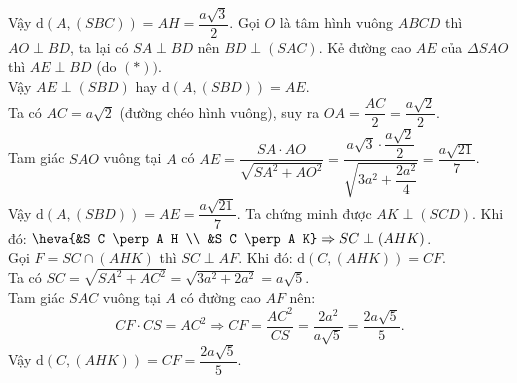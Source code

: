 \begin{ex}
{\begin{itemchoice}
    Vậy $\mathrm{d}(A,(S B C))=A H=\dfrac{a \sqrt{3}}{2}$.
   \itemch  Gọi $O$ là tâm hình vuông $A B C D$ thì $A O \perp B D$, ta lại có $S A \perp B D$ nên $B D \perp(S A C)$.\tagEX{*}
   \noindent Kẻ đường cao $A E$ của $\Delta S A O$ thì $A E \perp B D$  (do $(*))$.\\
   Vậy $A E  \perp(S B D)$ hay $\mathrm{d}(A,(S B D))=A E$.\\
   Ta có $A C=a \sqrt{2}$ (đường  chéo hình vuông), suy ra $O A=\dfrac{A C}{2}=\dfrac{a \sqrt{2}}{2}$.\\
   Tam giác $S A  O$ vuông tại $A$ có $A E=\dfrac{S A \cdot A O}{\sqrt{S A^2+A O^2}}=\dfrac{a \sqrt{3} \cdot \dfrac{a \sqrt{2}}{2}}{\sqrt{3 a^2+\dfrac{2 a^2}{4}}}=\dfrac{a \sqrt{21}}{7}$.\\
   Vậy $\mathrm{d}(A,(S B D))={AE}=\dfrac{a \sqrt{21}}{7}$. 
   \itemch Ta chứng minh được $A K \perp(S C D)$. Khi đó: $\heva{&S C \perp  A H \\ &S C \perp A K} \Rightarrow S C \perp(A H K)$.\\
   Gọi $F=S C \cap(A  H K)$ thì $S C \perp A F$.
   Khi đó: $\mathrm{d}(C,(A  H K))=C F$.\\
   Ta có $S C=\sqrt{S A^2+A C^2}=\sqrt{3  a^2+2 a^2}=a \sqrt{5}$.\\
   Tam giác $S  A C$ vuông tại $A$ có đường cao $A F$ nên:
   $$CF\cdot  CS=AC^2\Rightarrow CF=\dfrac{AC^2}{CS}=\dfrac{2a^2}{a\sqrt{5}}=\dfrac{2a\sqrt{5}}{5}.$$
   Vậy  $\mathrm{d}(C,(AHK))=CF=\dfrac{2a\sqrt{5}}{5}$.
  \end{itemchoice}
 } 
\end{ex}

